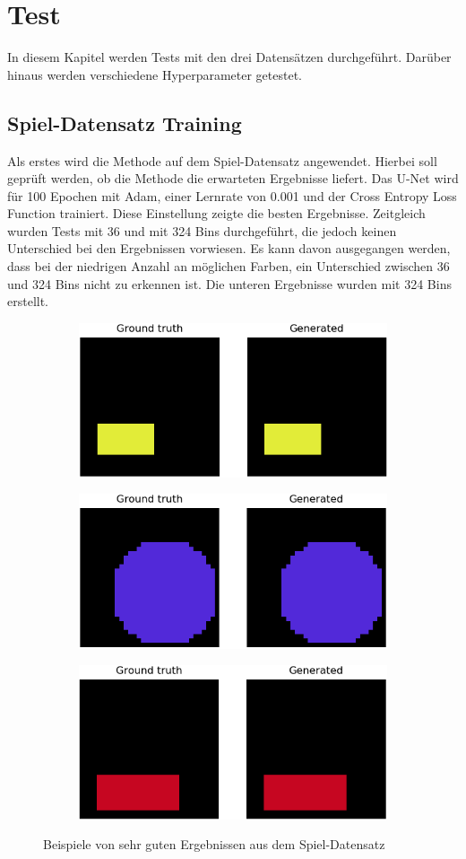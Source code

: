 \chapter{Test}
In diesem Kapitel werden Tests mit den drei Datensätzen durchgeführt. Darüber hinaus werden verschiedene Hyperparameter getestet.

\section{Spiel-Datensatz Training}
\label{experimente:spiel}
Als erstes wird die Methode auf dem Spiel-Datensatz angewendet. Hierbei soll geprüft werden, ob die Methode die erwarteten
Ergebnisse liefert. Das U-Net wird für 100 Epochen mit Adam, einer Lernrate von 0.001 und der Cross Entropy Loss Function trainiert. Diese
Einstellung zeigte die besten Ergebnisse. Zeitgleich wurden Tests mit 36 und mit 324 Bins durchgeführt, die jedoch keinen Unterschied bei den
Ergebnissen vorwiesen. Es kann davon ausgegangen werden, dass bei der niedrigen Anzahl an möglichen Farben, ein Unterschied zwischen 36 und 324 Bins
nicht zu erkennen ist. Die unteren Ergebnisse wurden mit 324 Bins erstellt.

\begin{figure}[H]
  \vspace{1cm}
  \begin{subfigure}
    \centering
    \includegraphics[width=.32\textwidth]{resources/experiments/30.png}
  \end{subfigure}
  \begin{subfigure}
    \centering
    \includegraphics[width=.32\textwidth]{resources/experiments/31.png}
  \end{subfigure}
  \begin{subfigure}
    \centering
    \includegraphics[width=.32\textwidth]{resources/experiments/42.png}
  \end{subfigure}
  \caption{Beispiele von sehr guten Ergebnissen aus dem Spiel-Datensatz}
  \label{image:gute-ergebnisse-toy-dataset}
\end{figure}

